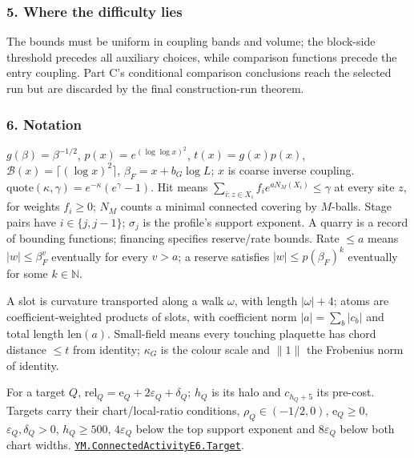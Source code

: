 \documentclass[
  letterpaper,
  11pt]{article}
\begin{document}
\subsubsection{5. Where the difficulty
lies}\label{where-the-difficulty-lies-17}

The bounds must be uniform in coupling bands and volume; the block-side
threshold precedes all auxiliary choices, while comparison functions
precede the entry coupling. Part C's conditional comparison conclusions
reach the selected run but are discarded by the final construction-run
theorem.

\subsubsection{6. Notation}\label{notation-17}

\(g(\beta)=\beta^{-1/2}\), \(p(x)=e^{(\log\log x)^2}\),
\(t(x)=g(x)p(x)\), \(\mathcal B(x)=\lceil(\log x)^2\rceil\),
\(\beta_F=x+b_G\log L\); \(x\) is coarse inverse coupling.
\(\mathrm{quote}(\kappa,\gamma)=e^{-\kappa}(e^\gamma-1)\). Hit means
\(\sum_{i:z\in X_i}f_i e^{aN_M(X_i)}\le\gamma\) at every site \(z\), for
weights \(f_i\ge0\); \(N_M\) counts a minimal connected covering by
\(M\)-balls. Stage pairs have \(i\in\{j,j-1\}\); \(\sigma_j\) is the
profile's support exponent. A quarry is a record of bounding functions;
financing specifies reserve/rate bounds. Rate \(\le a\) means
\(|w|\le\beta_F^v\) eventually for every \(v>a\); a reserve satisfies
\(|w|\le p(\beta_F)^k\) eventually for some \(k\in\mathbb N\).

A slot is curvature transported along a walk \(\omega\), with length
\(|\omega|+4\); atoms are coefficient-weighted products of slots, with
coefficient norm \(|a|=\sum_b|c_b|\) and total length
\(\mathrm{len}(a)\). Small-field means every touching plaquette has
chord distance \(\le t\) from identity; \(\kappa_G\) is the colour scale
and \(\|1\|\) the Frobenius norm of identity.

For a target \(Q\),
\(\mathrm{rel}_Q=\mathrm e_Q+2\varepsilon_Q+\delta_Q\); \(h_Q\) is its
halo and \(c_{h_Q+5}\) its pre-cost. Targets carry their
chart/local-ratio conditions, \(\rho_Q\in(-1/2,0)\),
\(\mathrm e_Q\ge0\), \(\varepsilon_Q,\delta_Q>0\), \(h_Q\ge500\),
\(4\varepsilon_Q\) below the top support exponent and \(8\varepsilon_Q\)
below both chart widths.
\href{https://github.com/yang-mills-group/OpenAI-YM-20261028/blob/3456e5e75cf8d4cd558955a5c7638fba2d68f464/YM/AnalyticNext/CONNECTED_ACTIVITY_JETS_E6/OptionCost.lean\#L62-L76}{\texttt{YM.ConnectedActivityE6.Target}}.
\end{document}
